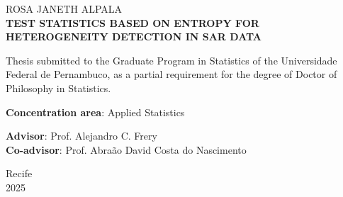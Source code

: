 \documentclass[
  letterpaper,
  11pt,
  english,
  doublespacing,
  headsepline,
  consistentlayout,
  oneside,
  openany]{MastersDoctoralThesis}
\begin{document}
\begin{titlepage}
  \thispagestyle{empty}
    \begin{center}
    {\large ROSA JANETH ALPALA}\\[4cm]
    {\Large \textbf{TEST STATISTICS BASED ON ENTROPY FOR HETEROGENEITY 
    DETECTION IN SAR DATA }}\\[4cm]
  \end{center}

  \noindent
  \hspace*{0.3\textwidth}
  \begin{minipage}{0.65\textwidth}
    Thesis submitted to the Graduate Program in Statistics of 
    the Universidade Federal de Pernambuco, as a partial requirement 
    for the degree of Doctor of Philosophy  in Statistics.
    
    \vspace{1em}
    \textbf{Concentration area}: Applied Statistics
    
    \vspace{2em} 
    \textbf{Advisor}: Prof. Alejandro C. Frery \\
    \textbf{Co-advisor}: Prof. Abraão David Costa do Nascimento
  \end{minipage}
  
  \vfill
  \begin{center}
    Recife\\
    2025
  \end{center}
\end{titlepage}

\end{document}
